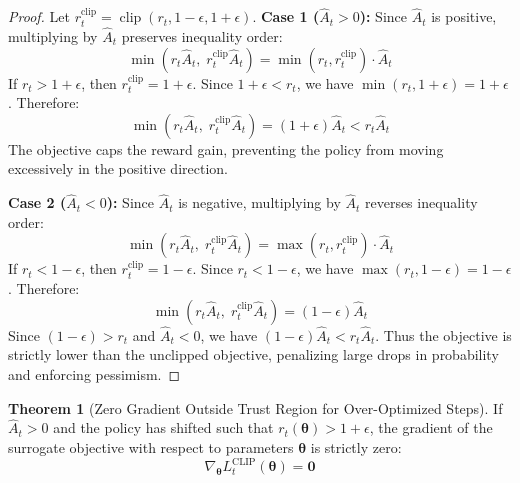 \documentclass[11pt,a4paper]{article}
\theoremstyle{definition}
\newtheorem{theorem}{\textbf{Theorem}}[section]
\begin{document}
\begin{proof}
Let $r_t^{\text{clip}} = \operatorname{clip}(r_t, 1 - \epsilon, 1 + \epsilon)$.
\textbf{Case 1 ($\widehat{A}_t > 0$):}
Since $\widehat{A}_t$ is positive, multiplying by $\widehat{A}_t$ preserves inequality order:
{\boldmath
\begin{equation}
\min\left( r_t \widehat{A}_t, \; r_t^{\text{clip}} \widehat{A}_t \right) = \min(r_t, r_t^{\text{clip}}) \cdot \widehat{A}_t
\end{equation}
}
If $r_t > 1 + \epsilon$, then $r_t^{\text{clip}} = 1 + \epsilon$.
Since $1 + \epsilon < r_t$, we have $\min(r_t, 1 + \epsilon) = 1 + \epsilon$.
Therefore:
{\boldmath
\begin{equation}
\min\left( r_t \widehat{A}_t, \; r_t^{\text{clip}} \widehat{A}_t \right) = (1 + \epsilon) \widehat{A}_t < r_t \widehat{A}_t
\end{equation}
}
The objective caps the reward gain, preventing the policy from moving excessively in the positive direction.

\textbf{Case 2 ($\widehat{A}_t < 0$):}
Since $\widehat{A}_t$ is negative, multiplying by $\widehat{A}_t$ reverses inequality order:
{\boldmath
\begin{equation}
\min\left( r_t \widehat{A}_t, \; r_t^{\text{clip}} \widehat{A}_t \right) = \max(r_t, r_t^{\text{clip}}) \cdot \widehat{A}_t
\end{equation}
}
If $r_t < 1 - \epsilon$, then $r_t^{\text{clip}} = 1 - \epsilon$.
Since $r_t < 1 - \epsilon$, we have $\max(r_t, 1 - \epsilon) = 1 - \epsilon$.
Therefore:
{\boldmath
\begin{equation}
\min\left( r_t \widehat{A}_t, \; r_t^{\text{clip}} \widehat{A}_t \right) = (1 - \epsilon) \widehat{A}_t
\end{equation}
}
Since $(1 - \epsilon) > r_t$ and $\widehat{A}_t < 0$, we have $(1 - \epsilon) \widehat{A}_t < r_t \widehat{A}_t$.
Thus the objective is strictly lower than the unclipped objective, penalizing large drops in probability and enforcing pessimism.
\end{proof}

\begin{theorem}[Zero Gradient Outside Trust Region for Over-Optimized Steps]
If $\widehat{A}_t > 0$ and the policy has shifted such that $r_t(\boldsymbol{\theta}) > 1 + \epsilon$, the gradient of the surrogate objective with respect to parameters $\boldsymbol{\theta}$ is strictly zero:
{\boldmath
\begin{equation}
\nabla_{\boldsymbol{\theta}} L_t^{\text{CLIP}}(\boldsymbol{\theta}) = \mathbf{0}
\end{equation}
}
\end{theorem}
\end{document}
